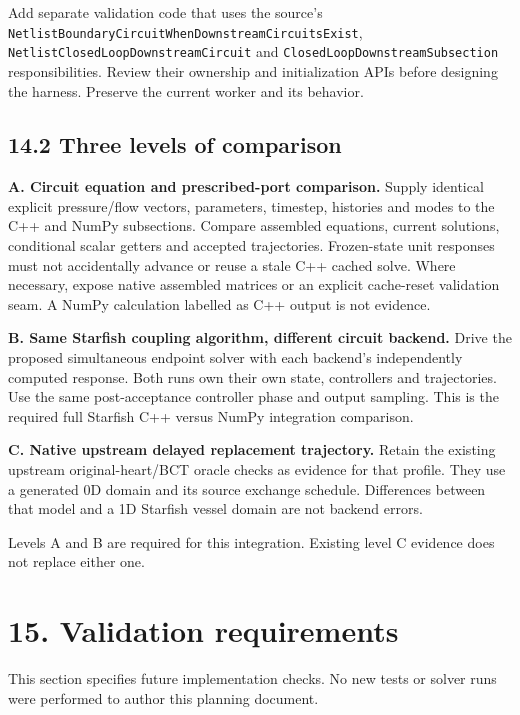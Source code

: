 \documentclass[11pt,a4paper]{article}
\begin{document}
Add separate validation code that uses the source's \texttt{Netlist\allowbreak{}Boundary\allowbreak{}Circuit\allowbreak{}When\allowbreak{}Downstream\allowbreak{}Circuits\allowbreak{}Exist}, \texttt{Netlist\allowbreak{}Closed\allowbreak{}Loop\allowbreak{}Downstream\allowbreak{}Circuit} and \texttt{Closed\allowbreak{}Loop\allowbreak{}Downstream\allowbreak{}Subsection} responsibilities. Review their ownership and initialization APIs before designing the harness. Preserve the current worker and its behavior.

\subsection{14.2 Three levels of comparison}
\textbf{A. Circuit equation and prescribed-port comparison.} Supply identical explicit pressure/flow vectors, parameters, timestep, histories and modes to the C++ and NumPy subsections. Compare assembled equations, current solutions, conditional scalar getters and accepted trajectories. Frozen-state unit responses must not accidentally advance or reuse a stale C++ cached solve. Where necessary, expose native assembled matrices or an explicit cache-reset validation seam. A NumPy calculation labelled as C++ output is not evidence.

\textbf{B. Same Starfish coupling algorithm, different circuit backend.} Drive the proposed simultaneous endpoint solver with each backend's independently computed response. Both runs own their own state, controllers and trajectories. Use the same post-acceptance controller phase and output sampling. This is the required full Starfish C++ versus NumPy integration comparison.

\textbf{C. Native upstream delayed replacement trajectory.} Retain the existing upstream original-heart/BCT oracle checks as evidence for that profile. They use a generated 0D domain and its source exchange schedule. Differences between that model and a 1D Starfish vessel domain are not backend errors.

Levels A and B are required for this integration. Existing level C evidence does not replace either one.

\section{15. Validation requirements}
This section specifies future implementation checks. No new tests or solver runs were performed to author this planning document.
\end{document}
